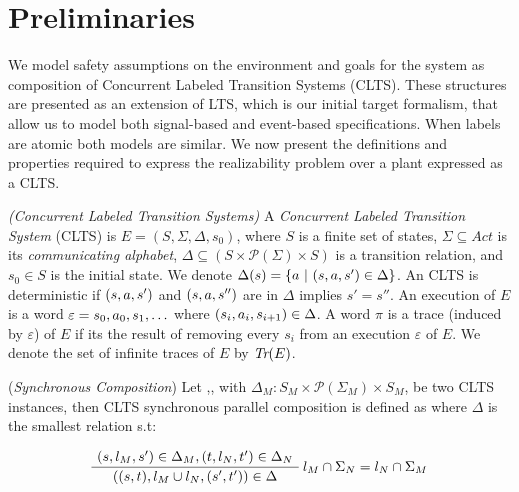 \section{Preliminaries}\label{sec:background}

We model safety assumptions on the environment and goals for the system as composition of Concurrent Labeled Transition Systems (CLTS). These structures are presented as an extension of LTS, which is our initial target formalism, that allow us to model both signal-based and event-based specifications. When labels are atomic both models are similar. We now present the definitions and properties required to express the realizability problem over a plant expressed as a CLTS.

\begin{definition}
	\label{def:CLTS} \emph{(Concurrent Labeled Transition Systems)} 
	A \emph{Concurrent Labeled Transition System} (CLTS) is $E =  (S, \Sigma, \Delta, s_0)$, where $S$ is a finite set of states, $\Sigma \subseteq Act$ is its {\em communicating alphabet}, $\Delta \subseteq (S \times \mathcal{P}(\Sigma) \times S)$ is a transition relation, and $s_0 \in S$ is the initial state.  We denote $\Delta(s)=\{a~|~(s,a,s') \in \Delta\}$. 
	An CLTS is deterministic if $(s,a,s')$ and $(s,a,s'')$ are in $\Delta$ implies $s'=s''$.
	An execution of $E$ is a word $\varepsilon=s_0, a_0, s_1, \ldots$ where $(s_i, a_i, s_{i+1}) \in \Delta$. 
	A word $\pi$ is a trace (induced by $\varepsilon$) of $E$ if its the result of removing every $s_i$ from an execution $\varepsilon$ of $E$. 
	We denote the set of infinite traces of $E$ by $\emph{Tr}(E)$. 
\end{definition}


\begin{definition} 
	\label{def:synchronous_composition}(\emph{Synchronous Composition}) Let ,, with $\Delta_M : S_M \times \mathcal{P}(\Sigma_M) \times S_M$, be two CLTS instances, then CLTS synchronous parallel composition is defined as  where $\Delta$ is the smallest relation s.t:
	\begin{center}
		\begin{equation}
		\AxiomC{$(s, l_M, s') \in \Delta_M,(t, l_N, t') \in \Delta_N  $}\RightLabel{$l_M \cap \Sigma_N = l_N \cap \Sigma_M$}
		\UnaryInfC{$((s,t),l_M \cup l_N,(s',t')) \in \Delta$}
		\DisplayProof	
		\end{equation}	
	\end{center}
\end{definition}

